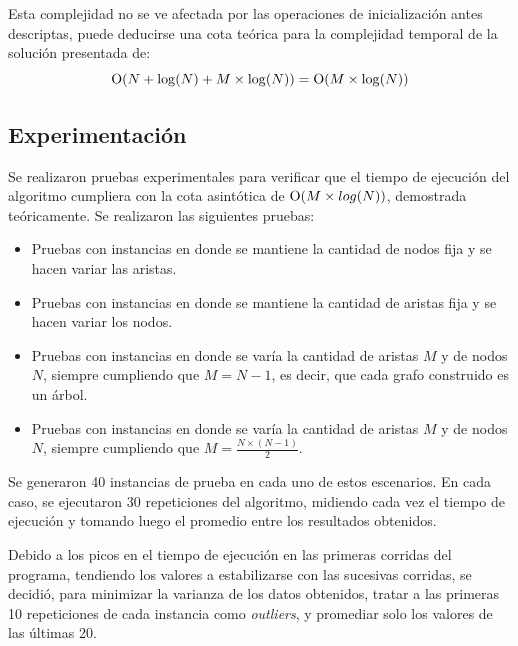     Esta complejidad no se ve afectada por las operaciones de inicialización
    antes descriptas, puede deducirse una cota teórica para
    la complejidad temporal de la solución presentada de:
    \[ \operatorname{O}(N + \log(N) + M \times \log(N)) = \operatorname{O}(M \times \log(N)) \]

    \subsection{Experimentación}

    Se realizaron pruebas experimentales para verificar que el tiempo de ejecución del algoritmo cumpliera con la cota asintótica de $\operatorname{O}(M \times log(N))$, demostrada teóricamente. Se realizaron las siguientes pruebas:

    \begin{itemize}
    \item Pruebas con instancias en donde se mantiene la cantidad de nodos fija y se hacen variar las aristas.
    \item Pruebas con instancias en donde se mantiene la cantidad de aristas fija y se hacen variar los nodos.
    \item Pruebas con instancias en donde se varía la cantidad de aristas $M$ y de nodos $N$, siempre cumpliendo que $M = N  - 1$, es decir, que cada grafo construido es un árbol.
    \item Pruebas con instancias en donde se varía la cantidad de aristas $M$ y de nodos $N$, siempre cumpliendo que $M = \frac{N \times (N - 1)}{2}$.
    \end{itemize}

    Se generaron 40 instancias de prueba en cada uno de estos escenarios. En cada caso, se ejecutaron 30 repeticiones del algoritmo, midiendo cada vez el tiempo de ejecución y tomando luego el promedio entre los resultados obtenidos.

    Debido a los picos en el tiempo de ejecución en las primeras corridas del programa, tendiendo los valores a estabilizarse con las sucesivas corridas, se decidió, para minimizar la varianza de los datos obtenidos, tratar a las primeras 10 repeticiones de cada instancia como \textit{outliers}, y promediar solo los valores de las últimas 20.

